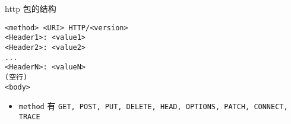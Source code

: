 
\begin{issues}
\issueDraft
\end{issues}

http 包的结构
\begin{lstlisting}[language=none]
<method> <URI> HTTP/<version>
<Header1>: <value1>
<Header2>: <value2>
...
<HeaderN>: <valueN>
(空行)
<body>
\end{lstlisting}

\begin{itemize}
\item \verb|method| 有 \verb|GET, POST, PUT, DELETE, HEAD, OPTIONS, PATCH, CONNECT, TRACE|
\end{itemize}
